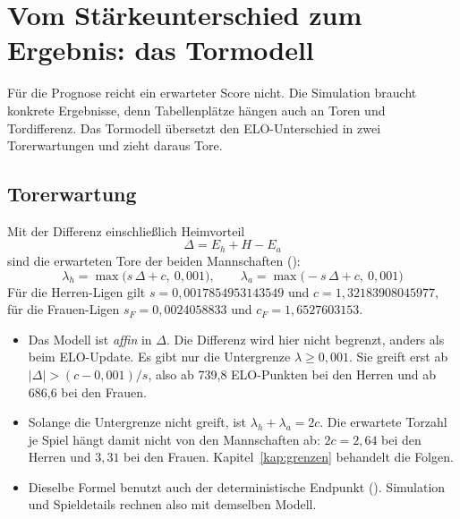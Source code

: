 \chapter{Vom Stärkeunterschied zum Ergebnis: das Tormodell}\label{kap:tormodell}

Für die Prognose reicht ein erwarteter Score nicht. Die Simulation braucht
konkrete Ergebnisse, denn Tabellenplätze hängen auch an Toren und
Tordifferenz. Das Tormodell übersetzt den ELO-Unterschied in zwei
Torerwartungen und zieht daraus Tore.

\section{Torerwartung}

Mit der Differenz einschließlich Heimvorteil
\begin{equation}
  \Delta = E_h + H - E_a
\end{equation}
sind die erwarteten Tore der beiden Mannschaften
():
\begin{equation}\label{eq:lambda}
  \boxed{\;\lambda_h = \max\bigl(s\,\Delta + c,\ 0{,}001\bigr), \qquad
          \lambda_a = \max\bigl(-s\,\Delta + c,\ 0{,}001\bigr)\;}
\end{equation}
Für die Herren-Ligen gilt $s = 0{,}0017854953143549$ und
$c = 1{,}32183908045977$, für die Frauen-Ligen $s_F = 0{,}0024058833$ und
$c_F = 1{,}6527603153$.

\begin{itemize}
  \item Das Modell ist \emph{affin} in $\Delta$. Die Differenz wird hier
        nicht begrenzt, anders als beim ELO-Update. Es gibt nur die
        Untergrenze $\lambda \ge 0{,}001$. Sie greift erst ab
        $\lvert\Delta\rvert > (c - 0{,}001)/s$, also ab 739{,}8 ELO-Punkten
        bei den Herren und ab 686{,}6 bei den Frauen.
  \item Solange die Untergrenze nicht greift, ist $\lambda_h + \lambda_a = 2c$.
        Die erwartete Torzahl je Spiel hängt damit nicht von den Mannschaften
        ab: $2c = 2{,}64$ bei den Herren und $3{,}31$ bei den Frauen.
        Kapitel~\ref{kap:grenzen} behandelt die Folgen.
  \item Dieselbe Formel benutzt auch der deterministische Endpunkt
        (). Simulation und Spieldetails
        rechnen also mit demselben Modell.
\end{itemize}

